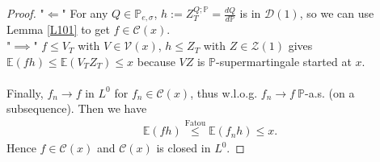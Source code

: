 \documentclass[12pt,a4paper, twoside]{article}
\theoremstyle{definition}
\newcommand{\EE}{\mathbb{E}} %
\newcommand{\PP}{\mathbb{P}} %
\begin{document}
\begin{proof}
"$\Longleftarrow$" For any $Q \in \PP_{e, \sigma}$, $h:= Z_T^{Q; \PP} = \frac{dQ}{d \PP}$ is in $\mathcal{D}(1)$, so we can use Lemma \ref{L101} to get $f \in \mathcal{C}(x)$. 
\\
"$\implies$" $f \leq V_T$ with $V \in \mathcal{V}(x)$, $h \leq Z_T$ with $Z \in \mathcal{Z}(1)$ gives $\EE(fh) \leq \EE(V_TZ_T) \leq x$ because $VZ$ is $\PP$-supermartingale started at $x$. 
\\\\
Finally, $f_n \to f$ in $L^0$ for $f_n \in \mathcal{C}(x)$, thus w.l.o.g. $f_n \to f \ \PP$-a.s. (on a subsequence). Then we have
\begin{align*}
\EE(fh) \overset{\text{Fatou}}\leq \EE(f_n h) \leq x.
\end{align*}
Hence $f \in \mathcal{C}(x)$ and $\mathcal{C}(x)$ is closed in $L^0$.
\end{proof}
\newpage
\end{document}
